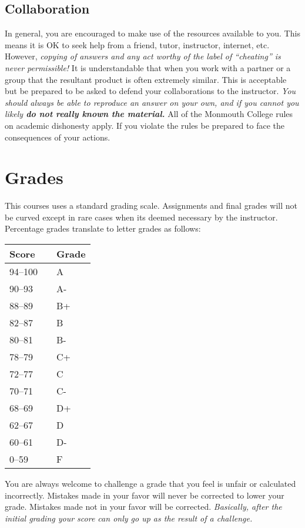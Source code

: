 \documentclass[]{tufte-handout}
\begin{document}
\subsection{Collaboration}

In general, you are encouraged to make use of the resources available to you.  This means it is OK to seek help from a friend, tutor, instructor, internet, etc.  However, \textit{copying of answers and any act worthy of the label of ``cheating'' is never permissible!}  It is understandable that when you work with a partner or a group that the resultant product is often extremely similar.  This is acceptable but be prepared to be asked to defend your collaborations to the instructor.  \textit{You should always be able to reproduce an answer on your own, and if you cannot you likely \textbf{do not really known the material.}} All of the Monmouth College rules on academic dishonesty apply.  If you violate the rules be prepared to face the consequences of your actions.

\section{Grades}

This courses uses a standard grading scale.  Assignments and final grades will not be curved except in rare cases when its deemed necessary by the instructor.  Percentage grades translate to letter grades as follows:

\begin{center}
\begin{small}
\begin{tabular}{lcl}
Score & & Grade \\ \toprule
94--100 & & A \\
90--93 & & A- \\
88--89 & & B+ \\
82--87 & & B \\
80--81 & & B- \\
78--79 & & C+ \\
72--77 & & C \\
70--71 & & C- \\
68--69 & & D+ \\
62--67 & & D \\
60--61 & & D- \\
0--59 & & F
\end{tabular}
\end{small}
\end{center}

You are always welcome to challenge a grade that you feel is unfair or calculated incorrectly.  Mistakes made in your favor will never be corrected to lower your grade.  Mistakes made not in your favor will be corrected.  \textit{Basically, after the initial grading your score can only go up as the result of a challenge.}
\end{document}
